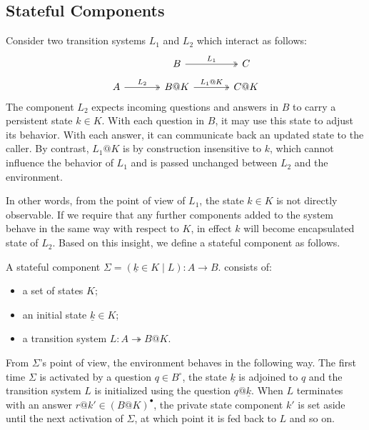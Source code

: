 \documentclass[acmsmall,screen,review,anonymous]{acmart}
\newcommand{\que}{\circ}
\newcommand{\ans}{\bullet}
\newcommand{\intl}[1]{\underline{#1}}
\begin{document}

\subsection{Stateful Components} %

Consider two transition systems $L_1$ and $L_2$
which interact as follows:
\[
  \begin{tikzcd}[row sep=small, column sep=large]
    & B \ar[r, twoheadrightarrow, "L_1"] & C \\
    A \ar[r, twoheadrightarrow, "L_2"] &
    B@K \ar[r, twoheadrightarrow, "L_1@K"] &
    C@K
  \end{tikzcd}
\]
The component $L_2$ expects
incoming questions and answers in $B$
to carry a persistent state $k \in K$.
With each question in $B$,
it may use this state to adjust its behavior.
With each answer,
it can communicate back an updated state to the caller.
By contrast,
$L_1@K$ is by construction insensitive to $k$,
which cannot influence the behavior of $L_1$
and is passed unchanged
between $L_2$ and the environment.

In other words,
from the point of view of $L_1$,
the state $k \in K$ is not directly observable.
If we require that any further components
added to the system
behave in the same way with respect to $K$,
in effect $k$ will become encapsulated state of $L_2$.
Based on this insight,
we define a stateful component as follows.

\begin{definition} \label{def:slts}
A stateful component
$\Sigma = (\intl{k} \in K \mid L) : A \rightarrow B$.
consists of:
\begin{itemize}
  \item a set of states $K$;
  \item an initial state $\intl{k} \in K$;
  \item a transition system $L : A \twoheadrightarrow B@K$.
\end{itemize}
\end{definition}

From $\Sigma$'s point of view,
the environment behaves in the following way.
The first time $\Sigma$ is activated by a question $q \in B^\que$,
the state $\intl{k}$ is adjoined to $q$
and the transition system $L$ is initialized using the question $q@\intl{k}$.
When $L$ terminates with an answer $r@k' \in (B@K)^\ans$,
the private state component $k'$
is set aside until
the next activation of $\Sigma$,
at which point it is fed back to $L$ and so on.
\end{document}
